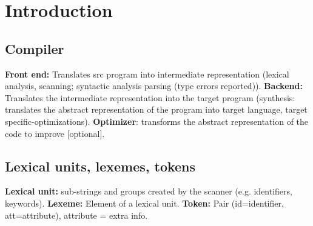 \section{Introduction}
\subsection*{Compiler}
\textbf{Front end:} Translates src program into intermediate representation (lexical analysis, scanning; syntactic analysis parsing (type errors reported)). \textbf{Backend:} Translates the intermediate representation into the target program (synthesis: translates the abstract representation of the program into target language, target specific-optimizations). \textbf{Optimizer}: transforms the abstract representation of the code to improve [optional].
\subsection*{Lexical units, lexemes, tokens}
\textbf{Lexical unit:} sub-strings and groups created by the scanner (e.g. identifiers, keywords). \textbf{Lexeme:} Element of a lexical unit. \textbf{Token:} Pair (id=identifier, att=attribute), attribute = extra info.
